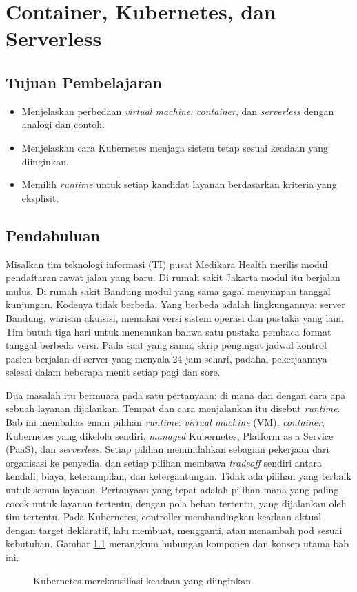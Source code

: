 \chapter{Container, Kubernetes, dan Serverless}
\label{ch:ch08}

\section*{Tujuan Pembelajaran}
\begin{itemize}
  \item Menjelaskan perbedaan \textit{virtual machine}, \textit{container}, dan \textit{serverless} dengan analogi dan contoh.
  \item Menjelaskan cara Kubernetes menjaga sistem tetap sesuai keadaan yang diinginkan.
  \item Memilih \textit{runtime} untuk setiap kandidat layanan berdasarkan kriteria yang eksplisit.
\end{itemize}

\section{Pendahuluan}

Misalkan tim teknologi informasi (TI) pusat Medikara Health merilis modul pendaftaran rawat jalan
yang baru. Di rumah sakit Jakarta modul itu berjalan mulus. Di rumah sakit Bandung modul yang sama
gagal menyimpan tanggal kunjungan. Kodenya tidak berbeda. Yang berbeda adalah lingkungannya: server
Bandung, warisan akuisisi, memakai versi sistem operasi dan pustaka yang lain. Tim butuh tiga hari
untuk menemukan bahwa satu pustaka pembaca format tanggal berbeda versi. Pada saat yang sama, skrip
pengingat jadwal kontrol pasien berjalan di server yang menyala 24 jam sehari, padahal pekerjaannya
selesai dalam beberapa menit setiap pagi dan sore.

Dua masalah itu bermuara pada satu pertanyaan: di mana dan dengan cara apa sebuah layanan
dijalankan. Tempat dan cara menjalankan itu disebut \textit{runtime}. Bab ini membahas enam pilihan
\textit{runtime}: \textit{virtual machine} (VM), \textit{container}, Kubernetes yang dikelola
sendiri, \textit{managed} Kubernetes, Platform as a Service (PaaS), dan \textit{serverless}. Setiap
pilihan memindahkan sebagian pekerjaan dari organisasi ke penyedia, dan setiap pilihan membawa
\textit{tradeoff} sendiri antara kendali, biaya, keterampilan, dan ketergantungan. Tidak ada pilihan
yang terbaik untuk semua layanan. Pertanyaan yang tepat adalah pilihan mana yang paling cocok untuk
layanan tertentu, dengan pola beban tertentu, yang dijalankan oleh tim tertentu.
Pada Kubernetes, controller membandingkan keadaan aktual dengan target
deklaratif, lalu membuat, mengganti, atau menambah pod sesuai kebutuhan.
Gambar \ref{fig:ch08-pelabuhan} merangkum hubungan komponen dan konsep utama bab ini.
\begin{figure}[!htb]
  \centering
  
  \caption{Kubernetes merekonsiliasi keadaan yang diinginkan}
  \label{fig:ch08-pelabuhan}
\end{figure}

